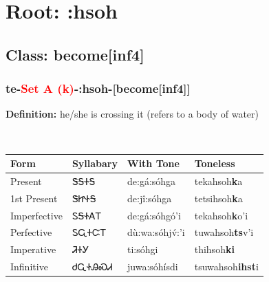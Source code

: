 \needspace{4in}
\section*{Root: :hsoh}
\nopagebreak
{}
\needspace{3in}
\subsection*{Class: become[inf4]}
\nopagebreak
\needspace{2in}
\subsubsection*{te{-}\textcolor{Red}{Set A (k)}{-}\textbf{:hsoh}{-}[become[inf4]]}
\nopagebreak
\textbf{Definition: } he/she is crossing it (refers to a body of water)
\\[0.5em]
\begin{tabularx}{\textwidth}{l X X X}%
\toprule%
\textbf{Form}&\textbf{Syllabary}&\textbf{With Tone}&\textbf{Toneless}\\%
\midrule%
Present&ᏕᎦᏐᎦ&de:gá:sóhga&tekahsoh\textbf{k}a\\%
1st Present&ᏕᏥᏐᎦ&de:jî:sóhga&tetsihsoh\textbf{k}a\\%
Imperfective&ᏚᎦᏐᎪᎢ&de:gá:sóhgó’i&tekahsoh\textbf{k}o'i\\%
Perfective&ᏚᏩᏐᏨᎢ&dù:wa:sóhjv́:’i&tuwahsoh\textbf{ts}v'i\\%
Imperative&ᏘᏐᎩ&ti:sóhgi&thihsoh\textbf{ki}\\%
Infinitive&ᏧᏩᏐᎯᏍᏗ&juwa:sóhísdi&tsuwahsoh\textbf{ihst}i\\%
\bottomrule%
\end{tabularx}
\\[1em]